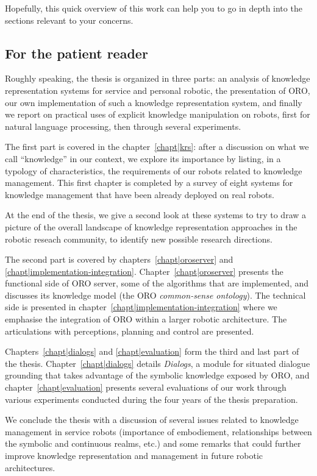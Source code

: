 Hopefully, this quick overview of this work can help you to go in depth into
the sections relevant to your concerns.


\subsection*{For the patient reader}

Roughly speaking, the thesis is organized in three parts: an analysis of
knowledge representation systems for service and personal robotic, the
presentation of ORO, our own implementation of such a knowledge representation
system, and finally we report on practical uses of explicit knowledge
manipulation on robots, first for natural language processing, then through
several experiments.

The first part is covered in the chapter~\ref{chapt|krs}: after a discussion on
what we call ``knowledge'' in our context, we explore its importance by
listing, in a typology of characteristics, the requirements of our robots
related to knowledge management. This first chapter is completed by a survey of
eight systems for knowledge management that have been already deployed on real
robots.

At the end of the thesis, we give a second look at these systems to try to
draw a picture of the overall landscape of knowledge representation approaches
in the robotic reseach community, to identify new possible research directions.

The second part is covered by chapters~\ref{chapt|oroserver} and
\ref{chapt|implementation-integration}. Chapter~\ref{chapt|oroserver} presents
the functional side of ORO server, some of the algorithms that are
implemented, and discusses its knowledge model (the ORO \emph{common-sense
ontology}). The technical side is presented in
chapter~\ref{chapt|implementation-integration} where we emphasise the
integration of ORO within a larger robotic architecture. The articulations with
perceptions, planning and control are presented.

Chapters~\ref{chapt|dialogs} and \ref{chapt|evaluation} form the third and last
part of the thesis. Chapter~\ref{chapt|dialogs} details \emph{Dialogs}, a
module for situated dialogue grounding that takes advantage of the symbolic
knowledge exposed by ORO, and chapter~\ref{chapt|evaluation} presents
several evaluations of our work through various experiments conducted during
the four years of the thesis preparation.

We conclude the thesis with a discussion of several issues related to knowledge
management in service robots (importance of embodiement, relationships between
the symbolic and continuous realms, etc.) and some remarks that could further
improve knowledge representation and management in future robotic
architectures.

